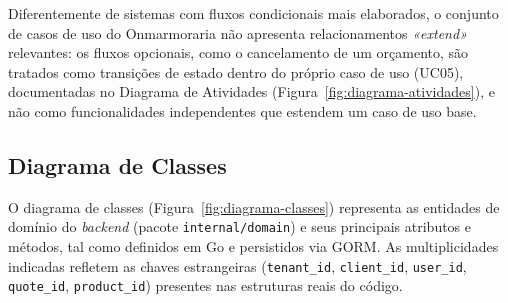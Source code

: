 Diferentemente de sistemas com fluxos condicionais mais elaborados, o conjunto de casos de uso do Onmarmoraria não apresenta relacionamentos \textit{«extend»} relevantes: os fluxos opcionais, como o cancelamento de um orçamento, são tratados como transições de estado dentro do próprio caso de uso (UC05), documentadas no Diagrama de Atividades (Figura~\ref{fig:diagrama-atividades}), e não como funcionalidades independentes que estendem um caso de uso base.

\subsection{Diagrama de Classes}
\label{sec:diagrama-classes}

O diagrama de classes (Figura~\ref{fig:diagrama-classes}) representa as entidades de domínio do \textit{backend} (pacote \texttt{internal/\allowbreak{}domain}) e seus principais atributos e métodos, tal como definidos em Go e persistidos via GORM. As multiplicidades indicadas refletem as chaves estrangeiras (\texttt{tenant\_id}, \texttt{client\_id}, \texttt{user\_id}, \texttt{quote\_id}, \texttt{product\_id}) presentes nas estruturas reais do código.


